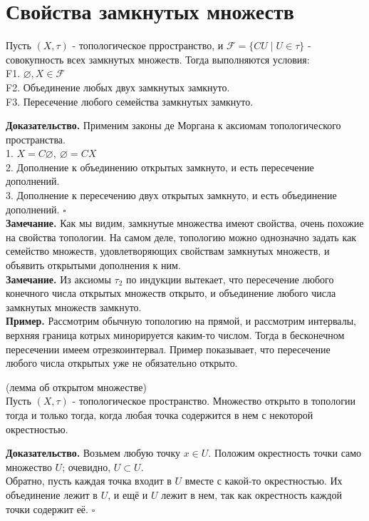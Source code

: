 \section{Свойства замкнутых множеств}
\begin{theor}
    Пусть $(X,\tau)$ - топологическое прространство, и  $\mathcal{F}=\{
    CU\mid U\in\tau\}$ - совокупность всех замкнутых множеств. Тогда 
    выполняются условия:\\
    F1. $\varnothing,X\in\mathcal F$\\
    F2. Объединение любых двух замкнутых замкнуто.\\
    F3. Пересечение любого семейства замкнутых замкнуто.\\
\end{theor}
\textbf{Доказательство.} Применим законы де Моргана к аксиомам топологического
пространства.\\
1. $X=C\varnothing,~\varnothing=CX$\\
2. Дополнение к объединению открытых замкнуто, и есть пересечение дополнений.\\
3. Дополнение к пересечению двух открытых замкнуто, и есть объединение 
дополнений. 
$\square$ \\
\textbf{Замечание.} Как мы видим, замкнутые множества имеют свойства, очень
похожие на свойства топологии. На самом деле, топологию можно однозначно 
задать как семейство множеств, удовлетворяющих свойствам замкнутых множеств,
и объявить открытыми дополнения к ним.\\
\textbf{Замечание.} Из аксиомы $\tau_2$ по индукции
вытекает, что пересечение любого конечного числа открытых множеств открыто,
и объединение любого числа замкнутых множеств замкнуто. \\
\textbf{Пример.} Рассмотрим обычную топологию на прямой, и рассмотрим 
интервалы, верхняя граница котрых минорируется каким-то числом. Тогда
в бесконечном пересечении имеем отрезкоинтервал. Пример показывает, что 
пересечение любого числа открытых уже не обязательно открыто.
\begin{theor}
    (лемма об открытом множестве)\\
    Пусть $(X,\tau)$ - топологическое пространство.
    Множество открыто в топологии тогда и только тогда, когда любая точка
    содержится в нем с некоторой окрестностью. 
\end{theor}
\textbf{Доказательство.}  Возьмем любую точку $x\in U$. Положим окрестность
точки само множество  $U$; очевидно,  $U\subset U$.\\
Обратно, пусть каждая точка входит в $U$ вместе с какой-то окрестностью. 
Их объединение лежит в $U$, и ещё и  $U$ лежит в нем, так как окрестность
каждой точки содержит её. $\square$ 
